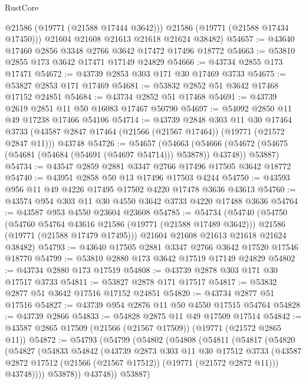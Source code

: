 \begin{lexlean}{RustCore}
\begin{coremodule}
          @21586
          (@19771 (@21588 @17444 @3642)))
        @21586
        (@19771 (@21588 @17434 @17450)))
      @21604
      @21608
      @21613
      @21618
      @21624
      @38482)
@54657 := @43640 @17460 @2856 @3348 @2766 @3642 @17472 @17496 @18772
@54663 := @53810 @2855 @173 @3642 @17471 @17149 @24829
@54666 := @43734 @2855 @173 @17471
@54672 := @43739 @2853 @303 @171 @30 @17469 @3733
@54675 := @53827 @2853 @171 @17469
@54681 := @53832 @2852 @51 @3642 @17468 @17152 @24851
@54684 := @43734 @2852 @51 @17468
@54691 := @43739 @2619 @2851 @11 @50 @16083 @17467 @50790
@54697 := @54092 @2850 @11 @49 @17238 @17466 @54106
@54714 := @43739
    @2848
    @303
    @11
    @30
    @17464
    @3733
    (@43587 @2847 @17464 (@21566 (@21567 @17464)) (@19771 (@21572 @2847 @11)))
    @43748
@54726 := @54657
    (@54663
      (@54666 (@54672 (@54675 (@54681 (@54684 (@54691 (@54697 @54714))) @53878)) @43748))
      @53887)
@54734 := @43547 @2859 @2881 @3347 @2766 @17496 @17505 @3642 @18772
@54740 := @43951 @2858 @50 @13 @17496 @17503 @4244
@54750 := @43593 @956 @11 @49 @4226 @17495 @17502 @4220 @17478 @3636 @43613
@54760 := @43574 @954 @303 @11 @30 @4550 @3642 @3733 @4220 @17488 @3636
@54764 := @43587 @953 @4550 @23604 @23608
@54785 := @54734
    (@54740
      (@54750
        (@54760 @54764 @43616 @21586 (@19771 (@21588 @17489 @3642)))
        @21586
        (@19771 (@21588 @17479 @17495)))
      @21604
      @21608
      @21613
      @21618
      @21624
      @38482)
@54793 := @43640 @17505 @2881 @3347 @2766 @3642 @17520 @17546 @18770
@54799 := @53810 @2880 @173 @3642 @17519 @17149 @24829
@54802 := @43734 @2880 @173 @17519
@54808 := @43739 @2878 @303 @171 @30 @17517 @3733
@54811 := @53827 @2878 @171 @17517
@54817 := @53832 @2877 @51 @3642 @17516 @17152 @24851
@54820 := @43734 @2877 @51 @17516
@54827 := @43739 @954 @2876 @11 @50 @4550 @17515 @54764
@54828 := @43739 @2866
@54833 := @54828 @2875 @11 @49 @17509 @17514
@54842 := @43587 @2865 @17509 (@21566 (@21567 @17509)) (@19771 (@21572 @2865 @11))
@54872 := @54793
    (@54799
      (@54802
        (@54808
          (@54811
            (@54817
              (@54820
                (@54827
                  (@54833
                    @54842
                    (@43739
                      @2873
                      @303
                      @11
                      @30
                      @17512
                      @3733
                      (@43587 @2872 @17512 (@21566 (@21567 @17512)) (@19771 (@21572 @2872 @11)))
                      @43748))))
              @53878))
          @43748))
      @53887)

\end{coremodule}
\end{lexlean}
